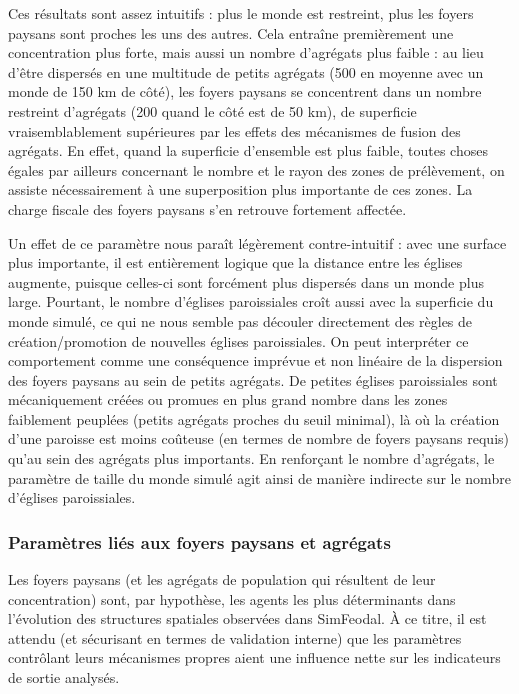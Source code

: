 Ces résultats sont assez intuitifs : plus le monde est restreint, plus les foyers paysans sont proches les uns des autres.
Cela entraîne premièrement une concentration plus forte, mais aussi un nombre d'agrégats plus faible : au lieu d'être dispersés en une multitude de petits agrégats (500 en moyenne avec un monde de 150 km de côté), les foyers paysans se concentrent dans un nombre restreint d'agrégats (200 quand le côté est de 50 km), de superficie vraisemblablement supérieures par les effets des mécanismes de fusion des agrégats.
En effet, quand la superficie d'ensemble est plus faible, toutes choses égales par ailleurs concernant le nombre et le rayon des zones de prélèvement, on assiste nécessairement à une superposition plus importante de ces zones.
La charge fiscale des foyers paysans s'en retrouve fortement affectée.

Un effet de ce paramètre nous paraît légèrement contre-intuitif : avec une surface plus importante, il est entièrement logique que la distance entre les églises augmente, puisque celles-ci sont forcément plus dispersés dans un monde plus large.
Pourtant, le nombre d'églises paroissiales croît aussi avec la superficie du monde simulé, ce qui ne nous semble pas découler directement des règles de création/promotion de nouvelles églises paroissiales.
On peut interpréter ce comportement comme une conséquence imprévue et non linéaire de la dispersion des foyers paysans au sein de petits agrégats.
De petites églises paroissiales sont mécaniquement créées ou promues en plus grand nombre dans les zones faiblement peuplées (petits agrégats proches du seuil minimal), là où la création d'une paroisse est moins coûteuse (en termes de nombre de foyers paysans requis) qu'au sein des agrégats plus importants.
En renforçant le nombre d'agrégats, le paramètre de taille du monde simulé agit ainsi de manière indirecte sur le nombre d'églises paroissiales.

\subsubsection{Paramètres liés aux foyers paysans et agrégats \label{subsubsec:sensib-fp}}

Les foyers paysans (et les agrégats de population qui résultent de leur concentration) sont, par hypothèse, les agents les plus déterminants dans l'évolution des structures spatiales observées dans SimFeodal.
À ce titre, il est attendu (et sécurisant en termes de validation interne) que les paramètres contrôlant leurs mécanismes propres aient une influence nette sur les indicateurs de sortie analysés.

